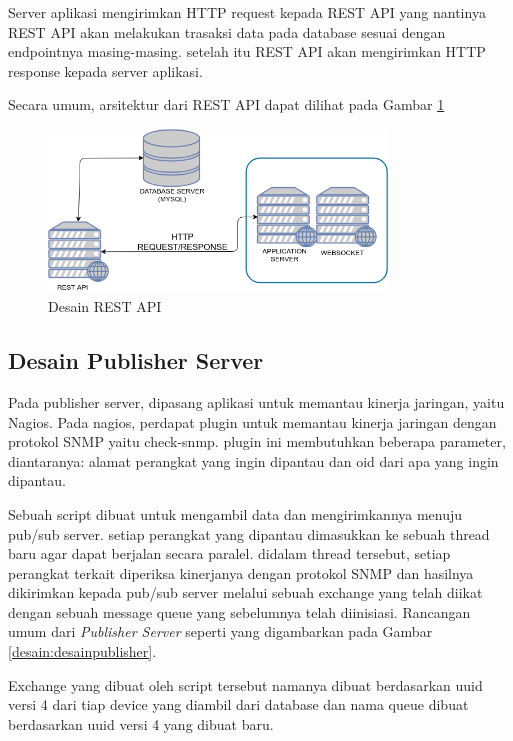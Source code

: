            	Server aplikasi mengirimkan HTTP request kepada REST API yang nantinya REST API akan melakukan trasaksi data pada database sesuai dengan endpointnya masing-masing. setelah itu REST API akan mengirimkan HTTP response kepada server aplikasi.
            	
            	Secara umum, arsitektur dari REST API dapat dilihat pada Gambar \ref{desain:desainrestapi}\\
                \begin{figure}[H]
                    \centering
                    \includegraphics[width=9cm]{Images/C-3/desainrestapi.png}
                    \caption{Desain REST API}
                    \label{desain:desainrestapi}
				\end{figure}
            
		\subsection{Desain Publisher Server}
			Pada publisher server, dipasang aplikasi untuk memantau kinerja jaringan, yaitu Nagios. Pada nagios, perdapat plugin untuk memantau kinerja jaringan dengan protokol SNMP yaitu check-snmp. plugin ini membutuhkan beberapa parameter, diantaranya: alamat perangkat yang ingin dipantau dan oid dari apa yang ingin dipantau.
			
			Sebuah script dibuat untuk mengambil data dan mengirimkannya menuju pub/sub server. setiap perangkat yang dipantau dimasukkan ke sebuah thread baru agar dapat berjalan secara paralel. didalam thread tersebut, setiap perangkat terkait diperiksa kinerjanya dengan protokol SNMP dan hasilnya dikirimkan kepada pub/sub server melalui sebuah exchange yang telah diikat dengan sebuah message queue yang sebelumnya telah diinisiasi. Rancangan umum dari \textit{Publisher Server} seperti yang digambarkan pada Gambar \ref{desain:desainpublisher}.
			
			Exchange yang dibuat oleh script tersebut namanya dibuat berdasarkan uuid versi 4 dari tiap device yang diambil dari database dan nama queue dibuat berdasarkan uuid versi 4 yang dibuat baru.
			
